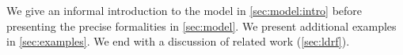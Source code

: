 
We give an informal introduction to the model in \textsection\ref{sec:model:intro} before presenting the precise formalities in \textsection\ref{sec:model}.
We present additional examples in \textsection\ref{sec:examples}.  We end
with a discussion of related work (\textsection\ref{sec:ldrf}).



